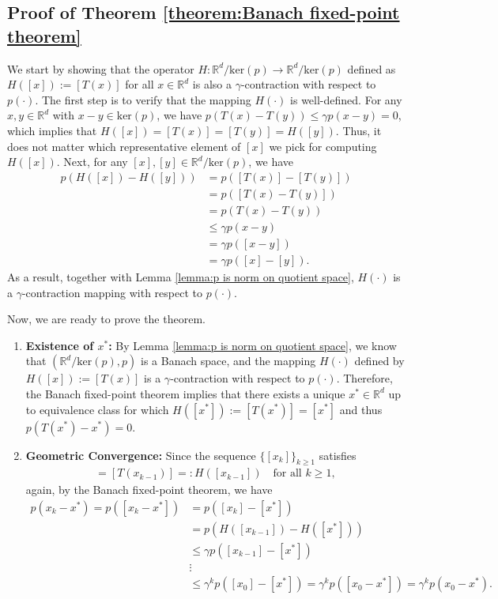 \documentclass[11 pt]{article}
\begin{document}
	
	
	
	\subsection{Proof of Theorem \ref{theorem:Banach fixed-point theorem}}\label{pf:theorem:Banach fixed-point theorem}
	We start by showing that the operator $H: \mathbb{R}^d/\text{ker}(p) \to \mathbb{R}^d/\text{ker}(p)$ defined as $H([x]) := [T(x)]$ for all $x\in\mathbb{R}^d$ is also a $\gamma$-contraction with respect to $p(\cdot)$. The first step is to verify that the mapping $H(\cdot)$ is well-defined. For any $x, y \in \mathbb{R}^d$ with $x-y \in \text{ker}(p)$, we have $p(T(x)-T(y)) \leq \gamma p(x-y) = 0$,
	which implies that $H([x])=[T(x)]=[T(y)]=H([y])$. Thus, it does not matter which representative
	element of $[x]$ we pick for computing $H([x])$. Next, for any $[x], [y] \in \mathbb{R}^d/\text{ker}(p)$, we have
	\begin{align*}
		p(H([x]) - H([y])) &= p([T(x)] - [T(y)]) \\
		&= p([T(x)-T(y)]) \\
		&= p(T(x)-T(y)) \\
		&\leq \gamma p(x-y)\\
		&= \gamma p([x-y])\\
		&= \gamma p([x]-[y]).
	\end{align*}
	As a result, together with Lemma \ref{lemma:p is norm on quotient space}, $H(\cdot)$ is a $\gamma$-contraction mapping with respect to $p(\cdot)$.
	
	Now, we are ready to prove the theorem. 
	
	\begin{enumerate}[(1)]
		\item \textbf{Existence of $x^*$:} By Lemma \ref{lemma:p is norm on quotient space}, we know that $\left(\mathbb{R}^d/\text{ker}(p), p \right)$ is a Banach space, and the mapping $H(\cdot)$ defined by $H([x]) := [T(x)]$
		is a $\gamma$-contraction with respect to $p(\cdot)$. Therefore, the Banach fixed-point theorem implies that there exists a unique $x^* \in \mathbb{R}^d$ up to equivalence class for which $H([x^*]):= [T(x^*)] = [x^*]$ and thus $p(T(x^*)-x^*) = 0$. 
		\item \textbf{Geometric Convergence:} Since the sequence $\{[x_k]\}_{k \geq 1}$ satisfies
		\begin{align*}
			[x_k] = [T(x_{k-1})] =: H([x_{k-1}]) \quad \text{for all } k \geq 1,
		\end{align*}
		again, by the Banach fixed-point theorem, we have
		\begin{align*}
			p(x_k - x^*) = p([x_k - x^*]) &= p([x_k] - [x^*]) \\
			&= p\left(H([x_{k-1}]) - H([x^*])\right)\\
			&\leq \gamma p\left([x_{k-1}] - [x^*]\right)\\
			&\vdots\\ 
			&\leq \gamma^k p([x_0] - [x^*])= \gamma^k p([x_0 - x^*]) = \gamma^k p(x_0 - x^*). 
		\end{align*}
	\end{enumerate}
	
\end{document}
